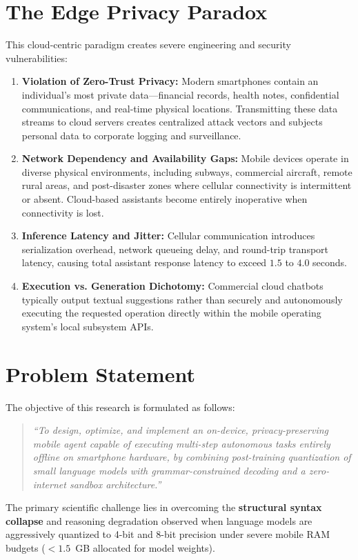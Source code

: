 \documentclass[12pt,a4paper,oneside]{report}
\begin{document}
\section{The Edge Privacy Paradox}
This cloud-centric paradigm creates severe engineering and security vulnerabilities:
\begin{enumerate}
    \item \textbf{Violation of Zero-Trust Privacy:} Modern smartphones contain an individual's most private data—financial records, health notes, confidential communications, and real-time physical locations. Transmitting these data streams to cloud servers creates centralized attack vectors and subjects personal data to corporate logging and surveillance.
    \item \textbf{Network Dependency and Availability Gaps:} Mobile devices operate in diverse physical environments, including subways, commercial aircraft, remote rural areas, and post-disaster zones where cellular connectivity is intermittent or absent. Cloud-based assistants become entirely inoperative when connectivity is lost.
    \item \textbf{Inference Latency and Jitter:} Cellular communication introduces serialization overhead, network queueing delay, and round-trip transport latency, causing total assistant response latency to exceed $1.5$ to $4.0$ seconds.
    \item \textbf{Execution vs. Generation Dichotomy:} Commercial cloud chatbots typically output textual suggestions rather than securely and autonomously executing the requested operation directly within the mobile operating system's local subsystem APIs.
\end{enumerate}

\section{Problem Statement}
The objective of this research is formulated as follows:
\begin{quote}
\textit{``To design, optimize, and implement an on-device, privacy-preserving mobile agent capable of executing multi-step autonomous tasks entirely offline on smartphone hardware, by combining post-training quantization of small language models with grammar-constrained decoding and a zero-internet sandbox architecture.''}
\end{quote}

The primary scientific challenge lies in overcoming the \textbf{structural syntax collapse} and reasoning degradation observed when language models are aggressively quantized to 4-bit and 8-bit precision under severe mobile RAM budgets ($<1.5$~GB allocated for model weights).
\end{document}

